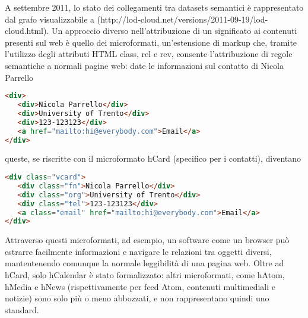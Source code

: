 \documentclass[sigproc-sp.tex]{subfiles}
\begin{document}
A settembre 2011, lo stato dei collegamenti tra datasets semantici è rappresentato dal grafo visualizzabile a (http://lod-cloud.net/versions/2011-09-19/lod-cloud.html).
Un approccio diverso nell’attribuzione di un significato ai contenuti presenti sul web è quello dei microformati, un’estensione di markup che, tramite l’utilizzo degli attributi HTML class, rel e rev, consente l’attribuzione di regole semantiche a normali pagine web: date le informazioni sul contatto di Nicola Parrello

\begin{lstlisting}[language=html]
<div>
   <div>Nicola Parrello</div>
   <div>University of Trento</div>
   <div>123-123123</div>
   <a href="mailto:hi@everybody.com">Email</a>
</div>
\end{lstlisting}

queste, se riscritte con il microformato hCard (specifico per i contatti), diventano

\begin{lstlisting}[language=html]
<div class="vcard">
   <div class="fn">Nicola Parrello</div>
   <div class="org">University of Trento</div>
   <div class="tel">123-123123</div>
   <a class="email" href="mailto:hi@everybody.com">Email</a>
</div>
\end{lstlisting}

Attraverso questi microformati, ad esempio, un software come un browser può estrarre facilmente informazioni e navigare le relazioni tra oggetti diversi, mantentenendo comunque la normale leggibilità di una pagina web. Oltre ad hCard, solo hCalendar è stato formalizzato: altri microformati, come hAtom, hMedia e hNews (rispettivamente per feed Atom, contenuti multimediali e notizie) sono solo più o meno abbozzati, e non rappresentano quindi uno standard.
\end{document}

